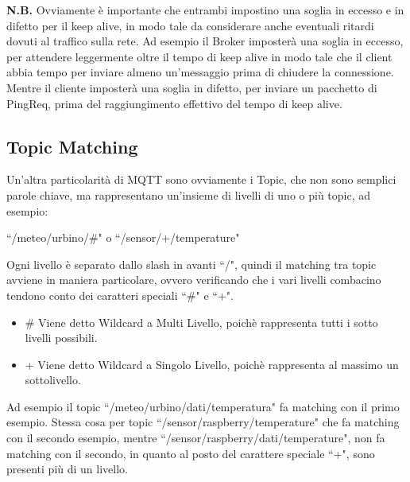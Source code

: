 \documentclass{article}
\begin{document}
\textbf{N.B.} Ovviamente è importante che entrambi impostino una soglia in eccesso e in difetto per il keep alive, in modo tale da considerare anche eventuali ritardi dovuti al traffico sulla rete. Ad esempio il Broker imposterà una soglia in eccesso, per attendere leggermente oltre il tempo di keep alive in modo tale che il client abbia tempo per inviare almeno un'messaggio prima di chiudere la connessione. Mentre il cliente imposterà una soglia in difetto, per inviare un pacchetto di PingReq, prima del raggiungimento effettivo del tempo di keep alive.

\subsection{Topic Matching}
Un'altra particolarità di MQTT sono ovviamente i Topic, che non sono semplici parole chiave, ma rappresentano un'insieme di livelli di uno o più topic, ad esempio:
\begin{center}
	``/meteo/urbino/\#" o ``/sensor/+/temperature"
\end{center}

Ogni livello è separato dallo slash in avanti ``/", quindi il matching tra topic avviene in maniera particolare, ovvero verificando che i vari livelli combacino tendono conto dei caratteri speciali ``\#" e ``+".
\begin{itemize}
	\item \# Viene detto Wildcard a Multi Livello, poichè rappresenta tutti i sotto livelli possibili.
	\item + Viene detto Wildcard a Singolo Livello, poichè rappresenta al massimo un sottolivello.
\end{itemize}
Ad esempio il topic ``/meteo/urbino/dati/temperatura" fa matching con il primo esempio. Stessa cosa per topic ``/sensor/raspberry/temperature" che fa matching con il secondo esempio, mentre ``/sensor/raspberry/dati/temperature", non fa matching con il secondo, in quanto al posto del carattere speciale ``+", sono presenti più di un livello.
\end{document}
